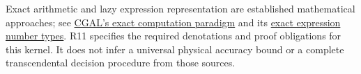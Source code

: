 \begin{panel}
Exact arithmetic and lazy expression representation are established mathematical
approaches; see \href{https://www.cgal.org/exact.html}{CGAL's exact computation
paradigm} and its \href{https://doc.cgal.org/latest/Number_types/group__nt__core.html}
{exact expression number types}. R11 specifies the required denotations and
proof obligations for this kernel. It does not infer a universal physical
accuracy bound or a complete transcendental decision procedure from those sources.
\end{panel}
